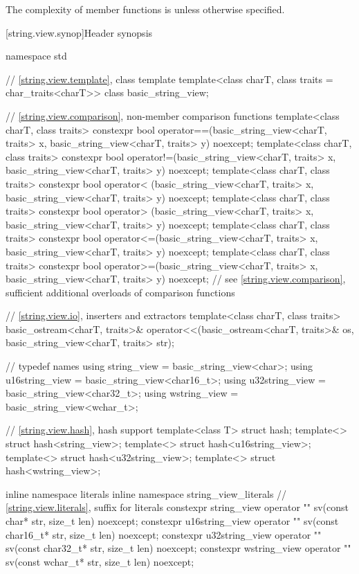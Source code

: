 \pnum
The complexity of  member functions is  unless otherwise specified.

[string.view.synop]{Header  synopsis}

%
%
\begin{codeblock}
namespace std {
  // \ref{string.view.template}, class template 
  template<class charT, class traits = char_traits<charT>>
  class basic_string_view;

  // \ref{string.view.comparison}, non-member comparison functions
  template<class charT, class traits>
    constexpr bool operator==(basic_string_view<charT, traits> x,
                              basic_string_view<charT, traits> y) noexcept;
  template<class charT, class traits>
    constexpr bool operator!=(basic_string_view<charT, traits> x,
                              basic_string_view<charT, traits> y) noexcept;
  template<class charT, class traits>
    constexpr bool operator< (basic_string_view<charT, traits> x,
                              basic_string_view<charT, traits> y) noexcept;
  template<class charT, class traits>
    constexpr bool operator> (basic_string_view<charT, traits> x,
                              basic_string_view<charT, traits> y) noexcept;
  template<class charT, class traits>
    constexpr bool operator<=(basic_string_view<charT, traits> x,
                              basic_string_view<charT, traits> y) noexcept;
  template<class charT, class traits>
    constexpr bool operator>=(basic_string_view<charT, traits> x,
                              basic_string_view<charT, traits> y) noexcept;
  // see \ref{string.view.comparison}, sufficient additional overloads of comparison functions

  // \ref{string.view.io}, inserters and extractors
  template<class charT, class traits>
    basic_ostream<charT, traits>&
      operator<<(basic_ostream<charT, traits>& os,
                 basic_string_view<charT, traits> str);

  //  typedef names
  using string_view    = basic_string_view<char>;
  using u16string_view = basic_string_view<char16_t>;
  using u32string_view = basic_string_view<char32_t>;
  using wstring_view   = basic_string_view<wchar_t>;

  // \ref{string.view.hash}, hash support
  template<class T> struct hash;
  template<> struct hash<string_view>;
  template<> struct hash<u16string_view>;
  template<> struct hash<u32string_view>;
  template<> struct hash<wstring_view>;

  inline namespace literals {
  inline namespace string_view_literals {
    // \ref{string.view.literals}, suffix for  literals
    constexpr string_view    operator "" sv(const char* str, size_t len) noexcept;
    constexpr u16string_view operator "" sv(const char16_t* str, size_t len) noexcept;
    constexpr u32string_view operator "" sv(const char32_t* str, size_t len) noexcept;
    constexpr wstring_view   operator "" sv(const wchar_t* str, size_t len) noexcept;
  }
  }
}
\end{codeblock}

